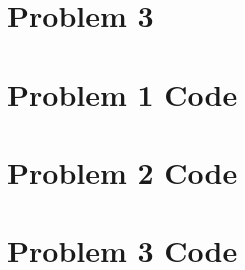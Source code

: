 \documentclass[11pt]{article}
\begin{document}
\section{Problem 3}
\pagebreak

\appendix
\section{Problem 1 Code}

\pagebreak

\section{Problem 2 Code}

\pagebreak

\section{Problem 3 Code}

\pagebreak
\end{document}
